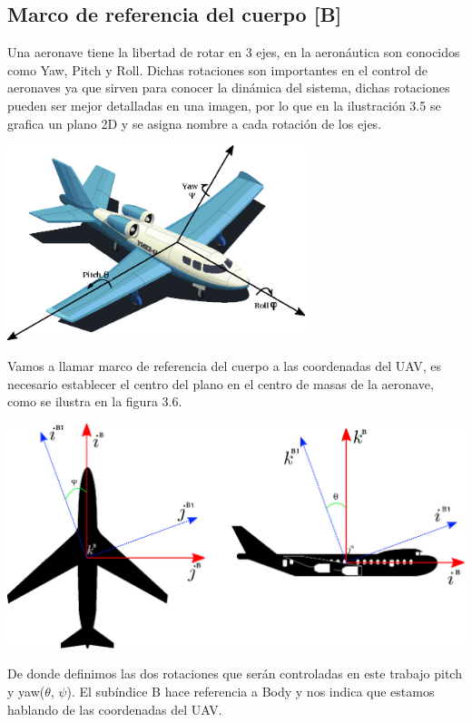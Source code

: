 \subsection{Marco de referencia del cuerpo [B]}
Una aeronave tiene la libertad de rotar en 3 ejes, en la aeronáutica son conocidos como
Yaw, Pitch y Roll. Dichas rotaciones son importantes en el control de aeronaves ya
que sirven para conocer la dinámica del sistema, dichas rotaciones pueden ser mejor
detalladas en una imagen, por lo que en la ilustración 3.5 se grafica un plano 2D
y se asigna nombre a cada rotación de los ejes.
\begin{center}
	\includegraphics[width=0.65\textwidth]{Contenido/Cuerpo/Capitulo3/Fig6.eps}
	\label{fig:ModeloMat:Fig1}
\end{center}
Vamos a llamar marco de referencia del cuerpo a las coordenadas del UAV, es necesario establecer el centro del plano en el
centro de masas de la aeronave, como se ilustra en la figura 3.6.
\begin{center}
	\includegraphics[width=0.9 \textwidth]{Contenido/Cuerpo/Capitulo3/Fig5.eps}
	\label{fig:ModeloMat:Fig1}
\end{center}
De donde definimos las dos rotaciones que serán controladas en este trabajo pitch y yaw($\theta$, $\psi$). El subíndice B hace referencia
a Body y nos indica que estamos hablando de las coordenadas del UAV.

